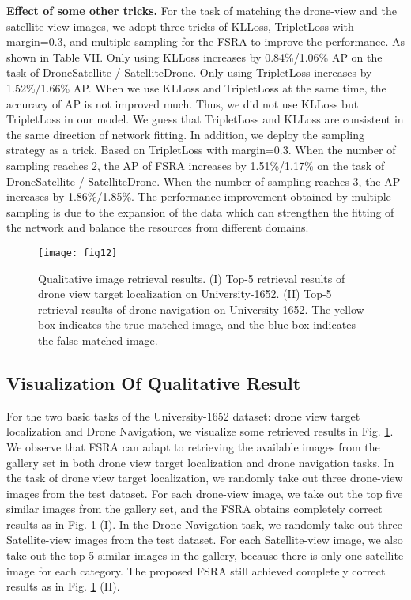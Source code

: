 \documentclass[lettersize,journal]{IEEEtran}
\begin{document}
\textbf{Effect of some other tricks.} For the task of matching the drone-view and the satellite-view images, we adopt three tricks of KLLoss, TripletLoss with margin=0.3, and multiple sampling for the FSRA to improve the performance. As shown in Table VII. Only using KLLoss increases by 0.84\%/1.06\% AP on the task of DroneSatellite / SatelliteDrone. Only using TripletLoss increases by 1.52\%/1.66\% AP. When we use KLLoss and TripletLoss at the same time, the accuracy of AP is not improved much. Thus, we did not use KLLoss but TripletLoss in our model. We guess that TripletLoss and KLLoss are consistent in the same direction of network fitting. In addition, we deploy the sampling strategy as a trick. Based on TripletLoss with margin=0.3. When the number of sampling reaches 2, the AP of FSRA increases by 1.51\%/1.17\% on the task of DroneSatellite / SatelliteDrone. When the number of sampling reaches 3, the AP increases by 1.86\%/1.85\%. The performance improvement obtained by multiple sampling is due to the expansion of the data which can strengthen the fitting of the network and balance the resources from different domains. 


\begin{figure}[!t]
\centering
\texttt{[image: fig12]}
\caption{Qualitative image retrieval results. (I) Top-5 retrieval results of drone view target localization on University-1652. (II) Top-5 retrieval results of drone navigation on University-1652. The yellow box indicates the true-matched image, and the blue box indicates the false-matched image.}
\label{fig_12}
\end{figure}


\subsection{Visualization Of Qualitative Result}
For the two basic tasks of the University-1652 dataset: drone view target localization and Drone Navigation, we visualize some retrieved results in Fig. \ref{fig_12}. We observe that FSRA can adapt to retrieving the available images from the gallery set in both drone view target localization and drone navigation tasks. In the task of drone view target localization, we randomly take out three drone-view images from the test dataset. For each drone-view image, we take out the top five similar images from the gallery set, and the FSRA obtains completely correct results as in Fig. \ref{fig_12} (I). In the Drone Navigation task, we randomly take out three Satellite-view images from the test dataset. For each Satellite-view image, we also take out the top 5 similar images in the gallery, because there is only one satellite image for each category. The proposed FSRA still achieved completely correct results as in Fig. \ref{fig_12} (II). 
\end{document}
